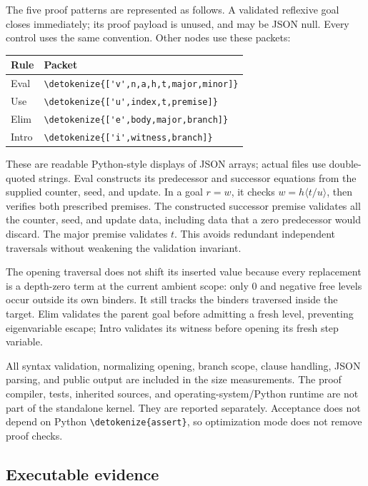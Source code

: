 \documentclass[11pt]{article}
\theoremstyle{definition}
\newcommand{\file}[1]{\expandafter\nolinkurl\expandafter{\detokenize{#1}}}
\begin{document}
The five proof patterns are represented as follows. A validated reflexive
goal closes immediately; its proof payload is unused, and may be JSON null.
Every control uses the same convention. Other nodes use these packets:
\begin{center}
\begin{tabular}{@{}ll@{}}
\toprule
Rule & Packet\\
\midrule
Eval & \file{['v',n,a,h,t,major,minor]}\\
Use & \file{['u',index,t,premise]}\\
Elim & \file{['e',body,major,branch]}\\
Intro & \file{['i',witness,branch]}\\
\bottomrule
\end{tabular}
\end{center}
These are readable Python-style displays of JSON arrays; actual files use
double-quoted strings. Eval constructs its predecessor and successor
equations from the supplied counter, seed, and update. In a goal $r=w$,
it checks $w=h\langle t/u\rangle$, then verifies both prescribed premises.
The constructed successor premise validates all the counter, seed, and
update data, including data that a zero predecessor would discard. The
major premise validates $t$. This avoids redundant independent traversals
without weakening the validation invariant.

The opening traversal does not shift its inserted value because every
replacement is a depth-zero term at the current ambient scope: only $0$
and negative free levels occur outside its own binders. It still tracks
the binders traversed inside the target. Elim validates the parent goal
before admitting a fresh level, preventing eigenvariable escape; Intro
validates its witness before opening its fresh step variable.

All syntax validation, normalizing opening, branch scope, clause handling,
JSON parsing, and public output are included in the size measurements.
The proof compiler, tests, inherited sources, and operating-system/Python
runtime are not part of the standalone kernel. They are reported separately.
Acceptance does not depend on Python \file{assert}, so optimization mode
does not remove proof checks.

\subsection{Executable evidence}
\end{document}
